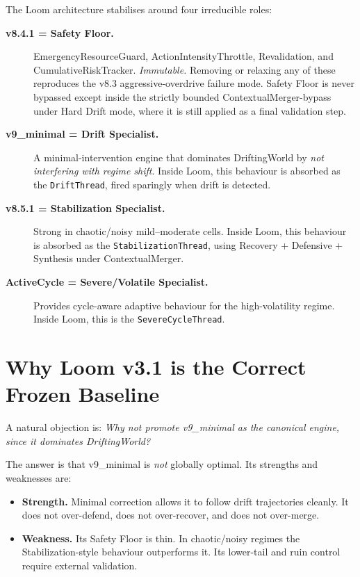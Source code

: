 The Loom architecture stabilises around four irreducible roles:

\begin{description}
  \item[\textbf{v8.4.1 = Safety Floor.}]
    EmergencyResourceGuard, ActionIntensityThrottle, Revalidation,
    and CumulativeRiskTracker. \emph{Immutable.} Removing or relaxing
    any of these reproduces the v8.3 aggressive-overdrive failure
    mode. Safety Floor is never bypassed except inside the strictly
    bounded ContextualMerger-bypass under Hard Drift mode, where it
    is still applied as a final validation step.
  \item[\textbf{v9\_minimal = Drift Specialist.}]
    A minimal-intervention engine that dominates DriftingWorld by
    \emph{not interfering with regime shift}. Inside Loom, this
    behaviour is absorbed as the \texttt{DriftThread}, fired
    sparingly when drift is detected.
  \item[\textbf{v8.5.1 = Stabilization Specialist.}]
    Strong in chaotic/noisy mild--moderate cells. Inside Loom, this
    behaviour is absorbed as the \texttt{StabilizationThread}, using
    Recovery + Defensive + Synthesis under ContextualMerger.
  \item[\textbf{ActiveCycle = Severe/Volatile Specialist.}]
    Provides cycle-aware adaptive behaviour for the high-volatility
    regime. Inside Loom, this is the \texttt{SevereCycleThread}.
\end{description}

\section{Why Loom v3.1 is the Correct Frozen Baseline}

A natural objection is: \emph{Why not promote v9\_minimal as the
canonical engine, since it dominates DriftingWorld?}

The answer is that v9\_minimal is \emph{not} globally optimal. Its
strengths and weaknesses are:

\begin{itemize}
  \item \textbf{Strength.} Minimal correction allows it to follow
    drift trajectories cleanly. It does not over-defend, does not
    over-recover, and does not over-merge.
  \item \textbf{Weakness.} Its Safety Floor is thin. In chaotic/noisy
    regimes the Stabilization-style behaviour outperforms it. Its
    lower-tail and ruin control require external validation.
\end{itemize}

